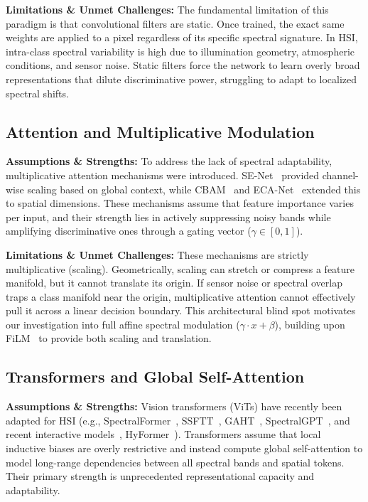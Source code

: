 \documentclass[pdflatex,sn-mathphys-num]{sn-jnl}
\theoremstyle{thmstyleone}
\theoremstyle{thmstyletwo}
\theoremstyle{thmstylethree}
\begin{document}
\textbf{Limitations \& Unmet Challenges:} The fundamental limitation of this paradigm is that convolutional filters are static. Once trained, the exact same weights are applied to a pixel regardless of its specific spectral signature. In HSI, intra-class spectral variability is high due to illumination geometry, atmospheric conditions, and sensor noise. Static filters force the network to learn overly broad representations that dilute discriminative power, struggling to adapt to localized spectral shifts.

\subsection{Attention and Multiplicative Modulation}
\textbf{Assumptions \& Strengths:} To address the lack of spectral adaptability, multiplicative attention mechanisms were introduced. SE-Net~\cite{hu2018squeeze} provided channel-wise scaling based on global context, while CBAM~\cite{woo2018cbam} and ECA-Net~\cite{wang2020eca} extended this to spatial dimensions. These mechanisms assume that feature importance varies per input, and their strength lies in actively suppressing noisy bands while amplifying discriminative ones through a gating vector ($\gamma \in [0,1]$).

\textbf{Limitations \& Unmet Challenges:} These mechanisms are strictly multiplicative (scaling). Geometrically, scaling can stretch or compress a feature manifold, but it cannot translate its origin. If sensor noise or spectral overlap traps a class manifold near the origin, multiplicative attention cannot effectively pull it across a linear decision boundary. This architectural blind spot motivates our investigation into full affine spectral modulation ($\gamma \cdot x + \beta$), building upon FiLM~\cite{perez2018film} to provide both scaling and translation.

\subsection{Transformers and Global Self-Attention}
\textbf{Assumptions \& Strengths:} Vision transformers (ViTs) have recently been adapted for HSI (e.g., SpectralFormer~\cite{hong2022spectralformer}, SSFTT~\cite{sun2022ssftt}, GAHT~\cite{mei2022gaht}, SpectralGPT~\cite{hong2024spectralgpt}, and recent interactive models~\cite{zhao2024sifanet,zhang2025stmnet,li2025ictnet,zeng2025hyperspectral,zhang2025spatial,zhou2025hyperspectral,wu2025efficient}, HyFormer~\cite{li2023hyformer}). Transformers assume that local inductive biases are overly restrictive and instead compute global self-attention to model long-range dependencies between all spectral bands and spatial tokens. Their primary strength is unprecedented representational capacity and adaptability.
\end{document}
